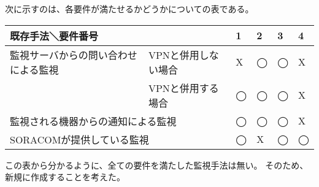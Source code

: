 	次に示すのは、各要件が満たせるかどうかについての表である。
	\begin{table}[htbp]
	\begin{tabular}{|l|l|l|l|l|l|} \hline
		\multicolumn{2}{|l|}{既存手法＼要件番号} & 
		\multicolumn{1}{|l|}{1} &
		\multicolumn{1}{|l|}{2} &
		\multicolumn{1}{|l|}{3} &
		\multicolumn{1}{|l|}{4} \\ \hline \hline
		監視サーバからの問い合わせによる監視 & VPNと併用しない場合 & X & ◯ & ◯ & X  \\ \cline{2-6}
			& VPNと併用する場合 & ◯ & ◯ & ◯ & X \\ \hline
		\multicolumn{2}{|l|}{監視される機器からの通知による監視} & ◯ & ◯ & ◯ & X \\ \hline
		\multicolumn{2}{|l|}{SORACOMが提供している監視} & ◯ & X & ◯ & ◯ \\ \hline
	\end{tabular}
	\end{table}
	この表から分かるように、全ての要件を満たした監視手法は無い。
	そのため、新規に作成することを考えた。
\begin{comment}
	しかし、サーバーからの問い合わせによる監視では、IoT機器が接続するネットワークがプライベートアドレスであった場合に利用できず、
	監視対象機器からの通知による監視では、新たに機器監視サーバをたち上げなくてはならない。
	また、ネットワークの提供者による機器の監視サービスでは、提供ネットワークを利用した機器のリンクアップ・ダウンしか監視することが出来ず、
	VPNを利用した方法では、IoT機器が接続するネットワークのアドレス帯が多様であることから、難しい。
\end{comment}
	
	







